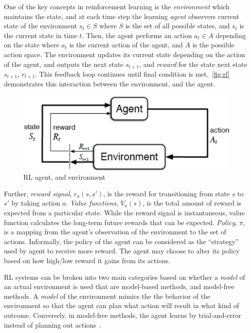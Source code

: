 \documentclass[a4paper, 12pt, conference]{IEEEtran}
\begin{document}
One of the key concepts in reinforcement learning is the \emph{environment} which maintains the state, and at each time step the learning \emph{agent} observers current state of the environment \(s_t \in S\) where \(S\) is the set of all possible states, and \(s_t\) is the current state in time \(t\). Then, the agent performs an action \(a_t \in A\) depending on the state where \(a_t\) is the current action of the agent, and \(A\) is the possible action space. The environment updates its current state depending on the action of the agent, and outputs the next state \(s_{t+1}\), and \emph{reward} for the state next state \(s_{t+1}\), \(r_{t+1}\). This feedback loop continues until final condition is met,~\autoref{fig:rl} demonstrates this interaction between the environment, and the agent.
\begin{figure}
    \centering
    \includegraphics[width=\linewidth]{img/rl.png}
    \caption{RL agent, and environment~\autocite{sutton2018reinforcement}}\label{fig:rl}
\end{figure}

Further, \emph{reward signal}, \(r_a(s,s')\), is the reward for transitioning from state \(s\) to \(s'\) by taking action \(a\). \emph{Value functions}, \(V_{\pi}(s)\), is the total amount of reward is expected from a particular state. While the reward signal is instantaneous, value function calculates the long-term future rewards that can be expected. \emph{Policy}, \(\pi \), is a mapping from the agent's observation of the environment to the set of actions. Informally, the policy of the agent can be considered as the ``strategy'' used by agent to receive more reward. The agent may choose to alter its policy based on how high/low reward it gains from its actions.

RL systems can be broken into two main categories based on whether a \emph{model} of an actual environment is used that are model-based methods, and model-free methods. A \emph{model} of the environment mimics the the behavior of the environment so that the agent can plan what action will result in what kind of outcome. Conversely, in model-free methods, the agent learns by trial-and-error instead of planning out actions~\autocite{sutton2018reinforcement}.
\end{document}
